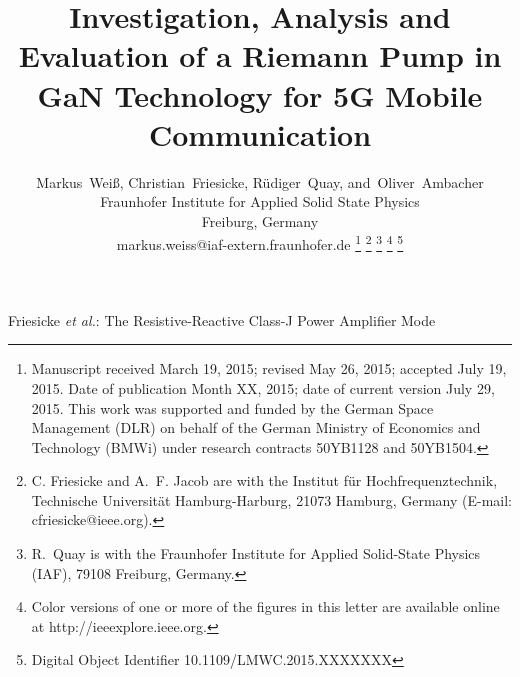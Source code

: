 \documentclass[journal]{IEEEtran}
\begin{document}
\title{Investigation, Analysis and Evaluation of a Riemann Pump in GaN Technology for 5G Mobile Communication}

\author{%
	Markus~Wei\ss{},
    Christian~Friesicke,
    R\"{u}diger~Quay,
    and~Oliver~Ambacher\\
    Fraunhofer Institute for Applied Solid State Physics\\
    Freiburg, Germany\\
    markus.weiss@iaf-extern.fraunhofer.de%
    \thanks{%
      Manuscript received March 19, 2015;
      revised May 26, 2015;
      accepted July 19, 2015.
      Date of publication Month XX, 2015;
      date of current version July 29, 2015.
      This work was supported and funded by the German Space Management
      (DLR) on behalf of the German Ministry of Economics and Technology (BMWi)
      under research contracts 50YB1128 and 50YB1504.%
    }%
    \thanks{
      C. Friesicke and A.~F. Jacob are with the Institut f\"{u}r
      Hochfrequenztechnik, Technische Universit\"{a}t Hamburg-Harburg, 21073
      Hamburg, Germany (E-mail: cfriesicke@ieee.org).%
    }%
    \thanks{R.~Quay is with the Fraunhofer Institute for Applied Solid-State
      Physics (IAF), 79108 Freiburg, Germany.%
    }%
    \thanks{%
      Color versions of one or more of the figures in this letter are available
      online at http://ieeexplore.ieee.org.}
    \thanks{%
      Digital Object Identifier 10.1109/LMWC.2015.XXXXXXX%
    }%
}

%
         {Friesicke \MakeLowercase{\textit{et al.}}:
          The Resistive-Reactive Class-J Power Amplifier Mode}

\maketitle


\end{document}
